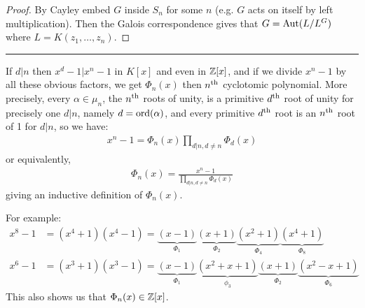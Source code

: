 \documentclass[10pt,a4paper]{article}
\begin{document}
\begin{proof}
By Cayley embed $G$ inside $S_n$ for some $n$ (e.g. $G$ acts on itself by left multiplication). Then the Galois correspondence gives that $G = \operatorname{Aut} (L/L^G)$ where $L = K(z_1, \ldots, z_n)$.
\end{proof}
\hrule
If $d|n$ then $x^d-1 | x^n-1$ in $K[x]$ and even in $\mathbb{Z}[x]$, and if we divide $x^n-1$ by all these obvious factors, we get $\Phi_n(x)$ then $n\textsuperscript{th}$ cyclotomic polynomial. More precisely, every $\alpha \in \mu_n$, the $n\textsuperscript{th}$ roots of unity, is a primitive $d\textsuperscript{th}$ root of unity for precisely one $d|n$, namely $d = \operatorname{ord}(\alpha)$, and every primitive $d\textsuperscript{th}$ root is an $n\textsuperscript{th}$ root of 1 for $d|n$, so we have:
\begin{align*}
x^n-1 = \Phi_n(x) \prod_{d|n, d\neq n} \Phi_d(x)
\end{align*}
or equivalently,
\begin{align*}
\Phi_n(x) = \frac{x^n-1}{\prod_{d|n, d\neq n}\Phi_d(x)}
\end{align*}
giving an inductive definition of $\Phi_n(x)$.

For example:
\begin{align*}
x^8-1 &= (x^4+1)(x^4-1) = \underbrace{(x-1)}_{\Phi_1}\underbrace{(x+1)}_{\Phi_2}\underbrace{(x^2+1)}_{\Phi_4}\underbrace{(x^4+1)}_{\Phi_8}\\
x^6-1 &= (x^3+1)(x^3-1) = \underbrace{(x-1)}_{\Phi_1}\underbrace{(x^2+x+1)}_{\phi_3}\underbrace{(x+1)}_{\Phi_2}\underbrace{(x^2-x+1)}_{\Phi_6}
\end{align*}
This also shows us that $\Phi_n(x) \in \mathbb{Z}[x]$.
\end{document}
